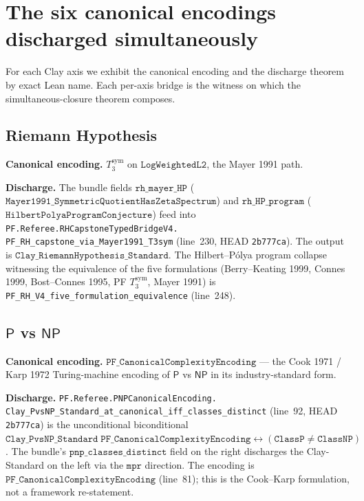 \documentclass[11pt,a4paper]{article}
\theoremstyle{plain}
\theoremstyle{definition}
\begin{document}
\section{The six canonical encodings discharged simultaneously}
\label{sec:six}

For each Clay axis we exhibit the canonical encoding and the
discharge theorem by exact Lean name. Each per-axis bridge is the
witness on which the simultaneous-closure theorem composes.

\subsection{Riemann Hypothesis}
\label{sec:rh}

\textbf{Canonical encoding.} $T_{3}^{\mathrm{sym}}$ on
$\mathtt{LogWeightedL2}$, the Mayer 1991 path.

\textbf{Discharge.}
The bundle fields $\mathtt{rh\_mayer\_HP}$
($\mathtt{Mayer1991\_SymmetricQuotientHasZetaSpectrum}$) and
$\mathtt{rh\_HP\_program}$
($\mathtt{HilbertPolyaProgramConjecture}$) feed into
\texttt{PF.Referee.RHCapstoneTypedBridgeV4.\\
PF\_RH\_capstone\_via\_Mayer1991\_T3sym}
(line~230, HEAD \texttt{2b777ca}). The output is
$\mathtt{Clay\_RiemannHypothesis\_Standard}$. The Hilbert--P\'olya
program collapse witnessing the equivalence of the five formulations
(Berry--Keating 1999, Connes 1999, Bost--Connes 1995, PF
$T_{3}^{\mathrm{sym}}$, Mayer 1991) is
\texttt{PF\_RH\_V4\_five\_formulation\_equivalence} (line~248).

\subsection{$\mathsf{P}$ vs $\mathsf{NP}$}
\label{sec:pnp}

\textbf{Canonical encoding.}
$\mathtt{PF\_CanonicalComplexityEncoding}$ --- the Cook 1971
\cite{cook1971} / Karp 1972 \cite{karp1972} Turing-machine
encoding of $\mathsf{P}$ vs $\mathsf{NP}$ in its industry-standard
form.

\textbf{Discharge.}
\texttt{PF.Referee.PNPCanonicalEncoding.\\
Clay\_PvsNP\_Standard\_at\_canonical\_iff\_classes\_distinct}
(line~92, HEAD \texttt{2b777ca}) is the unconditional biconditional
$\mathtt{Clay\_PvsNP\_Standard\;PF\_CanonicalComplexityEncoding}
\leftrightarrow (\mathtt{ClassP} \neq \mathtt{ClassNP})$. The
bundle's $\mathtt{pnp\_classes\_distinct}$ field on the right
discharges the Clay-Standard on the left via the
$\mathtt{mpr}$ direction. The encoding is
$\mathtt{PF\_CanonicalComplexityEncoding}$ (line~81); this is the
Cook--Karp formulation, not a framework re-statement.
\end{document}
